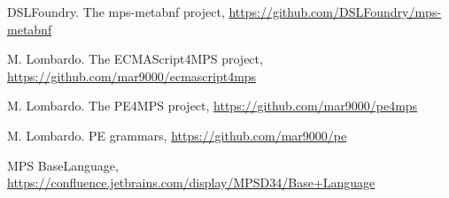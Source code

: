 \documentclass[sigplan,10pt,preprint]{acmart}
\begin{document}
\begin{thebibliography}{}
 DSLFoundry. The mps-metabnf project, \url{https://github.com/DSLFoundry/mps-metabnf}

 M. Lombardo. The ECMAScript4MPS project, \url{https://github.com/mar9000/ecmascript4mps}

 M. Lombardo. The PE4MPS project, \url{https://github.com/mar9000/pe4mps}

 M. Lombardo. PE grammars, \url{https://github.com/mar9000/pe}

 MPS BaseLanguage, \url{https://confluence.jetbrains.com/display/MPSD34/Base+Language}

\end{thebibliography}
\end{document}
